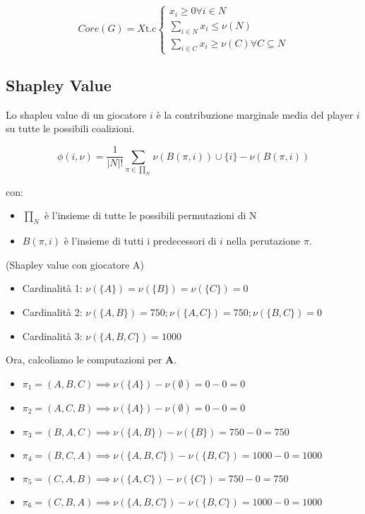 \begin{equation}
    Core(G) = X \text{t.c} \begin{cases}
        x_i \geq 0 \forall i \in N     \\
        \sum_{i \in N} x_i \leq \nu(N) \\
        \sum_{i \in C} x_i \geq \nu(C) \forall C \subseteq N
    \end{cases}
\end{equation}

\subsection{Shapley Value}

Lo shapleu value di un giocatore $i$ è la contribuzione marginale media del
player $i$ su tutte le possibili coalizioni.

\begin{equation}
    \phi(i,\nu) = \frac{1}{|N|!} \sum_{\pi \in \prod_N} \nu(B(\pi, i)) \cup \{i\} - \nu(B(\pi, i))
\end{equation}

con:
\begin{itemize}
    \item $\prod_N$ è l'insieme di tutte le possibili permutazioni di N
    \item $B(\pi, i)$ è l'insieme di tutti i predecessori di $i$ nella perutazione $\pi$.
\end{itemize}

\begin{esempio}(Shapley value con giocatore A)
\end{esempio}

\begin{itemize}
    \item Cardinalità 1: $\nu(\{A\}) = \nu(\{B\}) = \nu(\{C\}) = 0$
    \item Cardinalità 2: $\nu(\{A,B\}) = 750; \nu(\{A,C\}) = 750; \nu(\{B,C\}) = 0$
    \item Cardinalità 3: $\nu(\{A,B,C\}) = 1000$
\end{itemize}

Ora, calcoliamo le computazioni per \textbf{A}.

\begin{itemize}
    \item $\pi_1 = (A,B,C) \implies \nu(\{A\}) - \nu(\emptyset) = 0-0 = 0$
    \item $\pi_2 = (A,C,B) \implies \nu(\{A\}) - \nu(\emptyset) = 0-0 = 0$
    \item $\pi_3 = (B,A,C) \implies \nu(\{A,B\}) - \nu(\{B\}) = 750-0 = 750$
    \item $\pi_4 = (B,C,A) \implies \nu(\{A,B,C\})  - \nu(\{B,C\}) = 1000-0 = 1000$
    \item $\pi_5 = (C,A,B) \implies \nu(\{A,C\}) - \nu(\{C\}) = 750-0 = 750$
    \item $\pi_6 = (C,B,A) \implies \nu(\{A,B,C\}) - \nu(\{B,C\}) = 1000-0 = 1000$
\end{itemize}

